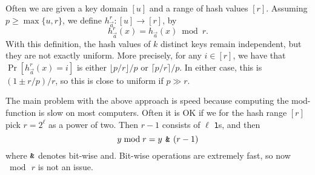 Often we are given a key domain $[u]$ and a range of hash values $[r]$. Assuming $p\geq \max\{u,r\}$, we define
$h^r_{\vec a}:[u]\to[r]$, by
\[h^r_{\vec a}(x)=h_{\vec a}(x)\bmod r.\]
With this definition, the hash values of $k$ distinct keys 
remain independent, but they are not exactly uniform. More
precisely, for any $i\in[r]$, we have that
$\Pr[h_{\vec a}^r(x)=i]$ is
either $\lfloor p/r\rfloor/p$ or $\lceil p/r\rceil/p$. In
either case, this is $(1\pm r/p)/r$, so this is close to uniform if
$p\gg r$.


The main problem with the above approach is speed because computing
the mod-function is slow on most computers. Often it
is OK if we for the hash range $[r]$ pick $r=2^\ell$ as a power of two.
Then $r-1$ consists of $\ell$ \texttt1s, and then 
\[y\bmod r=y\,\mathbin{\texttt{\&}} \,(r-1)\]
where $\mathbin{\texttt{\&}}$ denotes bit-wise {\sc and}. Bit-wise operations are
extremely fast, so now $\bmod\,r$ is not an issue.

